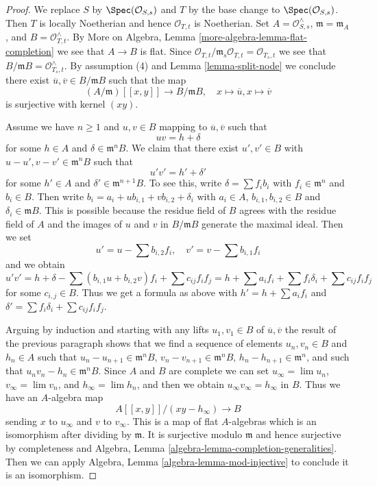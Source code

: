 \begin{proof}
We replace $S$ by $\Spec(\mathcal{O}_{S, s})$ and $T$ by the base change
to $\Spec(\mathcal{O}_{S, s})$. Then $T$ is locally Noetherian and hence
$\mathcal{O}_{T, t}$ is Noetherian.
Set $A = \mathcal{O}_{S, s}^\wedge$, $\mathfrak m = \mathfrak m_A$, and
$B = \mathcal{O}_{T, t}^\wedge$. By
More on Algebra, Lemma \ref{more-algebra-lemma-flat-completion}
we see that $A \to B$ is flat. Since
$\mathcal{O}_{T, t}/\mathfrak m_s \mathcal{O}_{T, t} = \mathcal{O}_{T_s, t}$
we see that $B/\mathfrak m B = \mathcal{O}_{T_s, t}^\wedge$.
By assumption (4) and Lemma \ref{lemma-split-node}
we conclude there exist $\overline{u}, \overline{v} \in B/\mathfrak m B$
such that the map
$$
(A/\mathfrak m)[[x, y]] \longrightarrow B/\mathfrak m B,\quad
x \longmapsto \overline{u},
x \longmapsto \overline{v}
$$
is surjective with kernel $(xy)$.

\medskip\noindent
Assume we have $n \geq 1$ and $u, v \in B$ mapping to
$\overline{u}, \overline{v}$ such that
$$
u v = h + \delta
$$
for some $h \in A$ and $\delta \in \mathfrak m^nB$.
We claim that there exist $u', v' \in B$ with
$u - u', v - v' \in \mathfrak m^n B$ such that
$$
u' v' = h' + \delta'
$$
for some $h' \in A$ and $\delta' \in \mathfrak m^{n + 1}B$.
To see this, write $\delta = \sum f_i b_i$ with
$f_i \in \mathfrak m^n$ and $b_i \in B$. Then write
$b_i = a_i + u b_{i, 1} + v b_{i, 2} + \delta_i$ with
$a_i \in A$, $b_{i, 1}, b_{i, 2} \in B$ and $\delta_i \in \mathfrak m B$.
This is possible because the residue field of $B$ agrees with the
residue field of $A$ and the images of $u$ and $v$ in $B/\mathfrak m B$
generate the maximal ideal. Then we set
$$
u' = u - \sum b_{i, 2}f_i,\quad
v' = v - \sum b_{i, 1}f_i
$$
and we obtain
$$
u'v' = h + \delta - \sum (b_{i, 1}u + b_{i, 2}v)f_i + \sum
c_{ij}f_if_j =
h + \sum a_if_i + \sum f_i \delta_i + \sum c_{ij}f_if_j
$$
for some $c_{i, j} \in B$.
Thus we get a formula as above with $h' = h + \sum a_if_i$
and $\delta' = \sum f_i \delta_i + \sum c_{ij}f_if_j$.

\medskip\noindent
Arguing by induction and starting with any lifts $u_1, v_1 \in B$
of $\overline{u}, \overline{v}$ the result of the previous paragraph
shows that we find a sequence of elements
$u_n, v_n \in B$ and $h_n \in A$ such that
$u_n - u_{n + 1} \in \mathfrak m^n B$,
$v_n - v_{n + 1} \in \mathfrak m^n B$,
$h_n - h_{n + 1} \in \mathfrak m^n$,
and such that $u_n v_n - h_n \in \mathfrak m^n B$.
Since $A$ and $B$ are complete we can set
$u_\infty = \lim u_n$, $v_\infty = \lim v_n$,  and
$h_\infty = \lim h_n$, and then we obtain $u_\infty v_\infty = h_\infty$
in $B$. Thus we have an $A$-algebra map
$$
A[[x, y]]/(xy - h_\infty) \longrightarrow B
$$
sending $x$ to $u_\infty$ and $v$ to $v_\infty$.
This is a map of flat $A$-algebras which is an
isomorphism after dividing by $\mathfrak m$.
It is surjective modulo $\mathfrak m$ and hence surjective
by completeness and
Algebra, Lemma \ref{algebra-lemma-completion-generalities}.
Then we can apply Algebra, Lemma \ref{algebra-lemma-mod-injective}
to conclude it is an isomorphism.
\end{proof}


